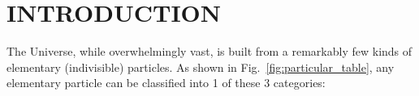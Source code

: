 \chapter{INTRODUCTION}
\label{ch:intro}
The Universe, while overwhelmingly vast, is built from a remarkably few kinds of elementary
(\ie indivisible) particles.
As shown in Fig.~\ref{fig:particular_table}, any elementary particle can be classified into 1 of these 3 categories:

